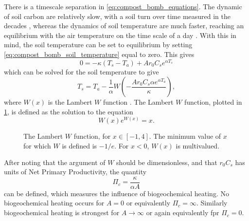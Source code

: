 There is a timescale separation in \cref{eq:compost_bomb_equations}. The dynamic of soil carbon are relatively slow, with a soil turn over time measured in the decades \parencite{Varney2022},
whereas the dynamics of soil temperature are much faster, reaching an equilibrium with the air temperature on the time scale of a day \parencite{Best2005}. With this in mind, the soil
temperature can be set to equilibrium by setting \cref{eq:compost_bomb_soil_temperature} equal to zero. This gives
\begin{equation*}
  0 = - \kappa \left(T_s - T_a\right) + Ar_0C_se^{\alpha T_s}
\end{equation*}
which can be solved for the soil temperature to  give
\begin{equation}
  \label{eq:soil_temperature_equilibrium}
  T_s = T_a - \frac{1}{\alpha} W\left(-\frac{Ar_0C_s \alpha e^{\alpha T_a}}{\kappa} \right),
\end{equation}
where $W(x)$ is the Lambert $W$ function \parencite{Corless1996}. The Lambert $W$ function, plotted in \cref{fig:lambert_W}, is defined as the solution to the equation
\begin{equation}
  \label{eq:lambert_W}
  W(x)e^{W(x)} = x.
\end{equation}

\begin{figure}
  \centering
  \caption[The Lambert $W$ function]{The Lambert $W$ function, for $x \in [-1,4]$. The minimum value of $x$ for which $W$ is defined is $-1/e$. For $x < 0$, $W(x)$ is
  multivalued.}
  \label{fig:lambert_W}
\end{figure}

After noting that the argument of $W$ should be dimensionless, and that $r_0C_s$ has units of Net Primary Productivity, the quantity 
\begin{equation}
  \label{eq:critical_npp}
  \Pi_c = \frac{\kappa}{\alpha A}
\end{equation}
can be defined, which measures the influence of biogeochemical heating. No biogeochemical heating occurs for $A = 0$ or equivalently $\Pi_c = \infty$. Similarly
biogeochemical heating is strongest for $A \rightarrow \infty$ or again equivalently fpr $\Pi_c = 0$.

